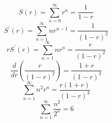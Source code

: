 \documentclass{article}
\begin{document}
\[
S(r)=\sum_{n=0}^{\infty}r^n=\frac{1}{1-r}
\]
\[
S^{\prime}(r)=\sum_{n=1}^{\infty}nr^{n-1}=\frac{1}{(1-r)^2}
\]
\[
rS^{\prime}(r)=\sum_{n=1}^{\infty}nr^n=\frac{r}{(1-r)^2}
\]
\[
\frac{d}{dr}\left(\frac{r}{(1-r)^2}\right)=\frac{1+r}{(1-r)^3}
\]
\[
\sum_{n=1}^{\infty}n^2r^n=\frac{r(1+r)}{(1-r)^3}
\]
\[
\sum_{n=1}^{\infty}\frac{n^2}{2^n}=6
\]
\end{document}
